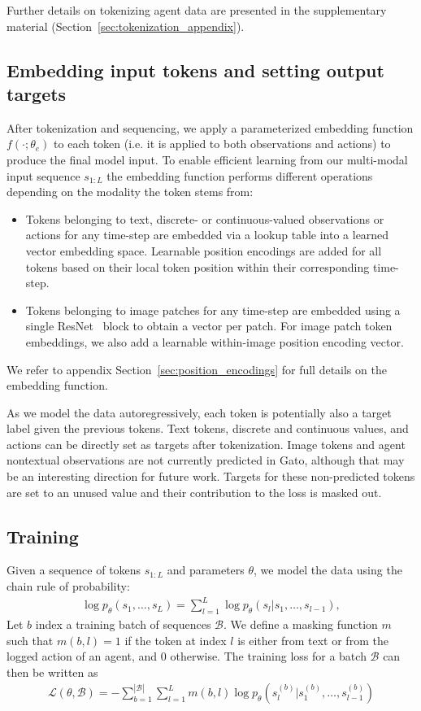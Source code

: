 \documentclass[10pt]{article} \usepackage[accepted]{tmlr}
\newcommand{\model}{{Gato}}
\begin{document}
\noindent Further details on tokenizing agent data are presented in the supplementary material (Section~\ref{sec:tokenization_appendix}).
\vskip 0.4cm
\subsection{Embedding input tokens and setting output targets}
\label{sec:embed}
\vskip 0.2cm
After tokenization and sequencing, we apply a parameterized embedding function $f(\cdot; \theta_e)$ to each token (i.e. it is applied to both observations and actions) to produce the final model input.
To enable efficient learning from our multi-modal input sequence $s_{1:L}$ the embedding function performs different operations depending on the modality the token stems from:



\begin{itemize}
\item Tokens belonging to text, discrete- or continuous-valued observations or actions for any time-step are embedded via a lookup table into a learned vector embedding space. Learnable position encodings are added for all tokens based on their local token position within their corresponding time-step. 
\item Tokens belonging to image patches for any time-step are embedded using a single ResNet~\citep{he2016deep} block to obtain a vector per patch. For image patch token embeddings, we also add a learnable within-image position encoding vector.
\end{itemize}
We refer to appendix Section~\ref{sec:position_encodings} for full details on the embedding function.

As we model the data autoregressively, each token is potentially also a target label given the previous tokens.
Text tokens, discrete and continuous values, and actions can be directly set as targets after tokenization.
Image tokens and agent nontextual observations are not currently predicted in \model{}, although that may be an interesting direction for future work.
Targets for these non-predicted tokens are set to an unused value and their contribution to the loss is masked out.
\vskip 0.4cm
\subsection{Training}
\vskip 0.2cm
Given a sequence of tokens $s_{1:L}$ and parameters $\theta$, we model the data using the chain rule of probability:
\begin{align}
     \log p_{\theta}(s_1,\ldots,s_L) = \sum_{l=1}^L \log p_{\theta}(s_l|s_1,\ldots,s_{l-1}), 
\end{align}
Let $b$ index a training batch of sequences $\mathcal{B}$.
We define a masking function $m$ such that $m(b,l)=1$ if the token at index $l$ is either from text or from the logged action of an agent, and $0$ otherwise.
The training loss for a batch $\mathcal{B}$ can then be written as
\begin{align}
    \mathcal{L}(\theta, \mathcal{B}) = - \sum_{b=1}^{|\mathcal{B}|} \sum_{l=1}^L m\left(b, l\right) \log p_\theta\left(s^{(b)}_l|s^{(b)}_1,\ldots,s^{(b)}_{l-1}\right)
\end{align}
\end{document}
